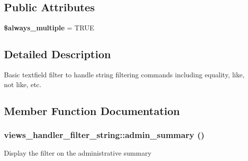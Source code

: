 \subsection*{Public Attributes}
\begin{DoxyCompactItemize}
\item 
\hypertarget{classviews__handler__filter__string_a50e5a3d32fcc79bc2269d8289d55593e}{
{\bfseries \$always\_\-multiple} = TRUE}
\label{classviews__handler__filter__string_a50e5a3d32fcc79bc2269d8289d55593e}

\end{DoxyCompactItemize}


\subsection{Detailed Description}
Basic textfield filter to handle string filtering commands including equality, like, not like, etc. 

\subsection{Member Function Documentation}
\hypertarget{classviews__handler__filter__string_a3152b0f2ce38cf493327e2a91b9c9f5e}{
\subsubsection[{admin\_\-summary}]{\setlength{\rightskip}{0pt plus 5cm}views\_\-handler\_\-filter\_\-string::admin\_\-summary ()}}
\label{classviews__handler__filter__string_a3152b0f2ce38cf493327e2a91b9c9f5e}
Display the filter on the administrative summary 

